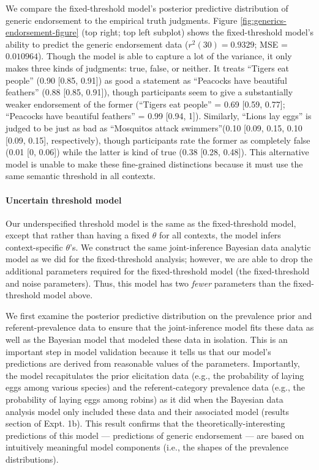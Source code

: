 \documentclass[english,floatsintext,man]{apa6}
\theoremstyle{definition}
\theoremstyle{definition}
\theoremstyle{definition}
\theoremstyle{remark}
\begin{document}
We compare the fixed-threshold model's posterior predictive distribution
of generic endorsement to the empirical truth judgments. Figure
\ref{fig:generics-endorsement-figure} (top right; top left subplot)
shows the fixed-threshold model's ability to predict the generic
endorsement data (\(r^2(30) = 0.9329\); MSE = \(0.010964\)). Though the
model is able to capture a lot of the variance, it only makes three
kinds of judgments: true, false, or neither. It treats \enquote{Tigers
eat people} (0.90 {[}0.85, 0.91{]}) as good a statement as
\enquote{Peacocks have beautiful feathers} (0.88 {[}0.85, 0.91{]}),
though participants seem to give a substantially weaker endorsement of
the former (\enquote{Tigers eat people} = 0.69 {[}0.59, 0.77{]};
\enquote{Peacocks have beautiful feathers} = 0.99 {[}0.94, 1{]}).
Similarly, \enquote{Lions lay eggs} is judged to be just as bad as
\enquote{Mosquitos attack swimmers}(0.10 {[}0.09, 0.15, 0.10 {[}0.09,
0.15{]}, respectively), though participants rate the former as
completely false (0.01 {[}0, 0.06{]}) while the latter is kind of true
(0.38 {[}0.28, 0.48{]}). This alternative model is unable to make these
fine-grained distinctions because it must use the same semantic
threshold in all contexts.

\paragraph{Uncertain threshold model}\label{uncertain-threshold-model}

Our underspecified threshold model is the same as the fixed-threshold
model, except that rather than having a fixed \(\theta\) for all
contexts, the model infers context-specific \(\theta\)'s. We construct
the same joint-inference Bayesian data analytic model as we did for the
fixed-threshold analysis; however, we are able to drop the additional
parameters required for the fixed-threshold model (the fixed-threshold
and noise parameters). Thus, this model has two \emph{fewer} parameters
than the fixed-threshold model above.

We first examine the posterior predictive distribution on the prevalence
prior and referent-prevalence data to ensure that the joint-inference
model fits these data as well as the Bayesian model that modeled these
data in isolation. This is an important step in model validation because
it tells us that our model's predictions are derived from reasonable
values of the parameters. Importantly, the model recapitulates the prior
elicitation data (e.g., the probability of laying eggs among various
species) and the referent-category prevalence data (e.g., the
probability of laying eggs among robins) as it did when the Bayesian
data analysis model only included these data and their associated model
(results section of Expt. 1b). This result confirms that the
theoretically-interesting predictions of this model --- predictions of
generic endorsement --- are based on intuitively meaningful model
components (i.e., the shapes of the prevalence distributions).
\end{document}

